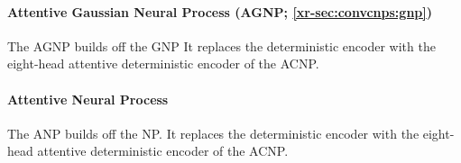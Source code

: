 \documentclass[12pt]{report}
\newcommand{\xrprefix}[1]{xr-#1}
\begin{document}
\paragraph{Attentive Gaussian Neural Process (AGNP; \cref{\xrprefix{sec:convcnps:gnp}})}
The AGNP builds off the GNP
It replaces the deterministic encoder with the eight-head attentive deterministic encoder of the ACNP.

\paragraph{Attentive Neural Process \parencite[ANP;][]{Kim:2019:Attentive_Neural_Processes}}
The ANP builds off the NP.
It replaces the deterministic encoder with the eight-head attentive deterministic encoder of the ACNP.
\end{document}
